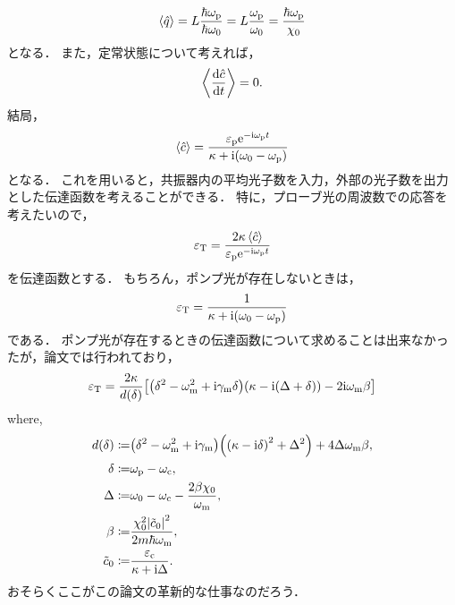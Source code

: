 \documentclass{report}
\begin{document}
      \begin{align}
        \ev{\hat{q}} = L\frac{\hbar\omega_{\r{p}}}{\hbar\omega_0} = L\frac{\omega_{\r{p}}}{\omega_0} = \frac{\hbar\omega_{\r{p}}}{\chi_0}
      \end{align}
      となる．
      また，定常状態について考えれば，
      \begin{align}
        \ev{\dv{\hat{c}}{t}} = 0.
      \end{align}
      結局，
      \begin{align}
        \ev{\hat{c}} = \frac{\epsilon_{\r{p}}\e^{-\i\omega_{\r{p}}t}}{\kappa + \i\qty(\omega_0 - \omega_{\r{p}})}
      \end{align}
      となる．
      これを用いると，共振器内の平均光子数を入力，外部の光子数を出力とした伝達函数を考えることができる．
      特に，プローブ光の周波数での応答を考えたいので，
      \begin{align}
        \epsilon_{\r{T}} = \frac{2\kappa\ev{\hat{c}}}{\epsilon_{\r{p}}\e^{-\i\omega_{\r{p}}t}}
      \end{align}
      を伝達函数とする．
      もちろん，ポンプ光が存在しないときは，
      \begin{align}
        \varepsilon_{\mathrm{T}} = \frac{1}{\kappa + \mathrm{i}\qty(\omega_0 - \omega_{\mathrm{p}})}
      \end{align}
      である．
      ポンプ光が存在するときの伝達函数について求めることは出来なかったが，論文では行われており，
      \begin{align}
        \varepsilon_{\mathrm{T}} = \frac{2\kappa}{d(\delta)}\qty[\qty(\delta^2 - \omega^2_{\mathrm{m}} + \mathrm{i}\gamma_{\mathrm{m}}\delta)\qty(\kappa - \mathrm{i}\qty(\Delta + \delta)) - 2\mathrm{i}\omega_{\mathrm{m}}\beta] \\ 
      \end{align}
      where,
      \begin{align}
        d(\delta) \coloneqq& \qty(\delta^2 - \omega^2_{\mathrm{m}} + \mathrm{i}\gamma_{\mathrm{m}})\qty(\qty(\kappa - \mathrm{i}\delta)^2 + \Delta^2) + 4\Delta\omega_{\mathrm{m}}\beta, \\ 
        \delta \coloneqq& \omega_{\mathrm{p}} - \omega_{\mathrm{c}}, \\ 
        \Delta \coloneqq& \omega_0 - \omega_{\mathrm{c}} - \frac{2\beta\chi_0}{\omega_{\mathrm{m}}}, \\ 
        \beta \coloneqq& \frac{\chi^2_0\abs{\tilde{c}_0}^2}{2m\hbar\omega_{\mathrm{m}}}, \\ 
        \tilde{c}_0 \coloneqq& \frac{\varepsilon_{\mathrm{c}}}{\kappa + \mathrm{i}\Delta}.
      \end{align}
      おそらくここがこの論文の革新的な仕事なのだろう．
\end{document}
